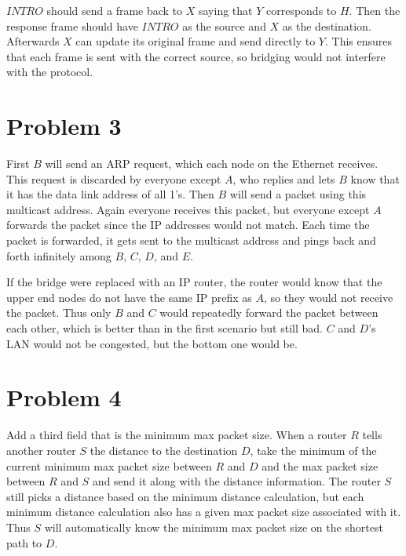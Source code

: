 \documentclass[12pt]{article}
\begin{document}
\(INTRO\) should send a frame back to \(X\) saying that \(Y\) corresponds to \(H\). Then the response frame should have \(INTRO\) as the source and \(X\) as the destination. Afterwards \(X\) can update its
original frame and send directly to \(Y\). This ensures that each frame is sent with the correct source, so bridging would not interfere with the protocol.

\section*{Problem 3}

First \(B\) will send an ARP request, which each node on the Ethernet receives. This request is discarded by everyone except \(A\), who replies and lets \(B\) know that it has the data link address of all 1's.
Then \(B\) will send a packet using this multicast address. Again everyone receives this packet, but everyone except \(A\) forwards the packet since the IP addresses would not match. Each time the packet is forwarded,
it gets sent to the multicast address and pings back and forth infinitely among \(B\), \(C\), \(D\), and \(E\).

If the bridge were replaced with an IP router, the router would know that the upper end nodes do not have the same IP prefix as \(A\), so they would not receive the packet. Thus only \(B\) and \(C\) would repeatedly
forward the packet between each other, which is better than in the first scenario but still bad. \(C\) and \(D\)'s LAN would not be congested, but the bottom one would be.

\section*{Problem 4}

Add a third field that is the minimum max packet size. When a router \(R\) tells another router \(S\) the distance to the destination \(D\), take the minimum of the current minimum max packet size between
\(R\) and \(D\) and the max packet size between \(R\) and \(S\) and send it along with the distance information. The router \(S\) still picks a distance based on the minimum distance calculation, but each
minimum distance calculation also has a given max packet size associated with it. Thus \(S\) will automatically know the minimum max packet size on the shortest path to \(D\).
\end{document}
